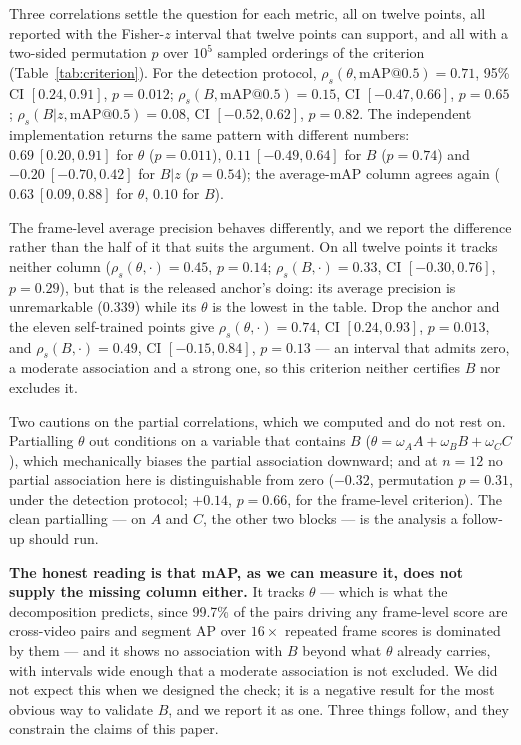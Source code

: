 \documentclass[number,preprint,12pt]{elsarticle}
\begin{document}
Three correlations settle the question for each metric, all on twelve points, all
reported with the Fisher-\(z\) interval that twelve points can support, and all
with a two-sided permutation \(p\) over \(10^5\) sampled orderings of the criterion
(Table~\ref{tab:criterion}). For the detection protocol,
\(\rho_s(\theta,\text{mAP@0.5})=0.71\), 95\% CI \([0.24,0.91]\), \(p=0.012\);
\(\rho_s(B,\text{mAP@0.5})=0.15\), CI \([-0.47,0.66]\), \(p=0.65\);
\(\rho_s(B|z,\text{mAP@0.5})=0.08\), CI \([-0.52,0.62]\), \(p=0.82\). The independent
implementation returns the same pattern with different numbers:
\(0.69\ [0.20,0.91]\) for \(\theta\) (\(p=0.011\)), \(0.11\ [-0.49,0.64]\) for \(B\)
(\(p=0.74\)) and \(-0.20\ [-0.70,0.42]\) for \(B|z\) (\(p=0.54\)); the average-mAP column
agrees again (\(0.63\ [0.09,0.88]\) for \(\theta\), \(0.10\) for \(B\)).

The frame-level average precision behaves differently, and we report the
difference rather than the half of it that suits the argument. On all twelve
points it tracks neither column (\(\rho_s(\theta,\cdot)=0.45\), \(p=0.14\);
\(\rho_s(B,\cdot)=0.33\), CI \([-0.30,0.76]\), \(p=0.29\)), but that is the released
anchor's doing: its average precision is unremarkable (\(0.339\)) while its
\(\theta\) is the lowest in the table. Drop the anchor and the eleven self-trained
points give \(\rho_s(\theta,\cdot)=0.74\), CI \([0.24,0.93]\), \(p=0.013\), and
\(\rho_s(B,\cdot)=0.49\), CI \([-0.15,0.84]\), \(p=0.13\) --- an interval that admits
zero, a moderate association and a strong one, so this criterion neither
certifies \(B\) nor excludes it.

Two cautions on the partial correlations, which we computed and do not rest on.
Partialling \(\theta\) out conditions on a variable that contains \(B\)
(\(\theta=\omega_A A+\omega_B B+\omega_C C\)), which mechanically biases the
partial association downward; and at \(n=12\) no partial association here is
distinguishable from zero (\(-0.32\), permutation \(p=0.31\), under the detection
protocol; \(+0.14\), \(p=0.66\), for the frame-level criterion). The clean
partialling --- on \(A\) and \(C\), the other two blocks --- is the analysis a
follow-up should run.

\textbf{The honest reading is that mAP, as we can measure it, does not supply the
missing column either.}
It tracks \(\theta\) --- which is what the decomposition predicts, since 99.7\% of
the pairs driving any frame-level score are cross-video pairs and segment AP
over \(16\times\) repeated frame scores is dominated by them --- and it shows no
association with \(B\) beyond what \(\theta\) already carries, with intervals wide
enough that a moderate association is not excluded.
We did not expect this when we designed the check; it is a negative result for
the most obvious way to validate \(B\), and we report it as one. Three things
follow, and they constrain the claims of this paper.
\end{document}
